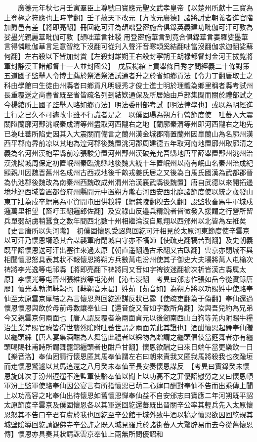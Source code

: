 　　廣德元年秋七月壬寅羣臣上尊號曰寶應元聖文武孝皇帝【以楚州所獻十三寶為上登極之符應也上時掌翻】壬子赦天下改元【方改元廣德】諸將討史朝義者進官階加爵邑有差【將即亮翻】冊回紇可汗為頡咄登密施合俱錄英義建功毗伽可汗可敦為娑墨光親麗華毗伽可敦【頡咄華言社稷用登密施華言到竟合俱錄華言婁羅娑墨華言得憐毗伽華言足意智紇下沒翻可從刋入聲汗音寒頡奚結翻咄當沒翻伽求迦翻娑蘇何翻】左右殺以下皆加封賞【左殺封雄朔王右殺封寜朔王胡禄都督封金河王拔覧將軍封静漢王諸都督十一人並封國公】　戊辰楊綰上貢舉條目秀才問經義二十條對策五道國子監舉人令博士薦於祭酒祭酒試通者升之於省如鄉貢法【令力丁翻唐取士之科由學館曰生徒由州縣者曰鄉貢凡明經秀才俊士進士明於理體為鄉里稱者縣考試州長重覆送之尚書省既至省皆疏名列到結欵通保及所居始由戶部集閲而關於禮部試之今楊綰所上國子監舉人略如鄉貢法】明法委刑部考試【明法律學也】或以為明經進士行之已久不可遽改事雖不行識者是之　以僕固瑒為朔方行營節度使　吐蕃入大震關陷蘭廓河鄯洮岷秦成渭等州盡取河西隴右之地【蘭廓秦渭等州即河西隴右之地先已為吐蕃所陷史因其入大震關而備言之蘭州漢金城郡隋置蘭州因臯蘭山為名廓州漢西平郡南界前凉以其地為湟河郡後魏置洮河郡周建德五年取河南地置廓州取廓清之義為名河州漢枹罕縣前凉張駿分置河州鄯州漢破羌允吾縣地唐平薛舉置鄯州洮州治漢洮陽城周保定初置岷州秦臨洮縣地後魏大統十年置岷州以南有岷山名秦州治成紀顯親川因魏晋舊州名成州古西戎地後千畝戎姜氏居之又後為白馬氏國漢為武都郡晉為仇池郡後魏改為南秦州西魏改成州渭州治漢襄武縣後魏置】唐自武德以來開拓邊境地連西域皆置都督府州縣開元中置朔方隴右河西安西北庭諸節度使以統之歲發山東丁壯為戍卒繒帛為軍資開屯田供糗糧【繒慈陵翻糗去久翻】設監牧畜馬牛軍城戍邏萬里相望【畜吁玉翻邏郎佐翻】及安祿山反邉兵精銳者皆徵發入援謂之行營所留兵單弱胡虜稍蠶食之數年間西北數十州相繼淪沒自鳳翔以西邠州以北皆為左袵矣【史言唐所以失河隴】　初僕固懷恩受詔與回紇可汗相見於太原河東節度使辛雲京以可汗乃懷恩壻恐其合謀襲軍府閉城自守亦不犒師【使疏吏翻犒苦到翻】及史朝義既平詔懷恩送可汗出塞往來過太原【朝直遥翻過古禾翻又古臥翻】雲京亦閉城不與相聞懷恩怒具表其狀不報懷恩將朔方兵數萬屯汾州使其子御史大夫瑒將萬人屯榆次禆將李光逸等屯祁縣【將即亮翻下禆將同又音如字禆彼迷翻榆次祈皆漢古縣属太原】李懷光等屯晉州張維嶽等屯沁州【沁七浸翻　考異曰邠志作張如岳今從實錄唐歷】懷光本勃海靺鞨也【靺鞨音末曷】姓茹【茹音如】為朔方將以功賜姓中使駱奉仙至太原雲京厚結之為言懷恩與回紇連謀反狀已露【使疏吏翻為于偽翻】奉仙還過懷恩懷恩與飲於母前母數讓奉仙曰【還音旋又音如字數所角翻】汝與吾兒約為兄弟今又親雲京何兩面也【唐人謂反覆者為兩面貞元以後劒南西山白狗等羌内附賜牛糧治生業差賜官祿皆得世襲然隂附吐蕃世謂之兩面羌此其證也】酒酣懷恩起舞奉仙贈以纒頭綵【唐人宴集酒酣為人舞當此禮者以綵物為贈謂之纒頭倡伎當筵舞者亦有纒頭喝賜杜甫詩所謂舞罷錦纒頭者也酣戶甘翻】懷恩欲酬之曰來日端午當更樂飲一日【樂音洛】奉仙固請行懷恩匿其馬奉仙謂左右曰朝來責我又匿我馬將殺我也夜踰垣而走懷恩驚遽以其馬追還之八月癸未奉仙至長安奏懷恩謀反　【考異曰實錄癸未懷恩旋師次于汾州逗遛不進監軍使駱奉仙以聞上以功高不之罪優詔慰勞之又曰懷恩頓軍汾上監軍使駱奉仙因公宴言有所指懷恩已萌二心肆口酬對奉仙不告而出乘傳上聞上以功高容之叱奉仙出待懷恩如舊懷恩惮奉仙益不自安邠志曰寶應二年河朔既平詔太原節度辛雲京及僕固懷恩各以其軍送回紇還蕃既出晋關辛公率其輕兵先入太原懷恩怒其不告曰辛君有虞於我也回紇至辛公館于城外致牛酒以犒之懷恩欲因回紇規其城壁隂導回紇請觀佛寺辛公許之既入城見羅兵於諸街蕃人大驚辟易而去今從舊懷恩傳】懷恩亦具奏其狀請誅雲京奉仙上兩無所問優詔和